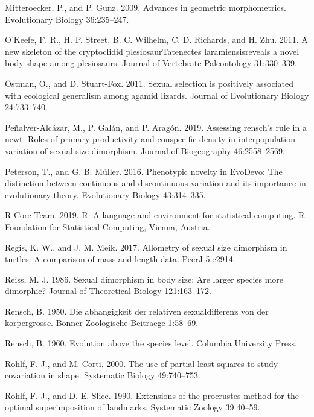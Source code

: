 \documentclass[]{article}
\begin{document}
\hypertarget{ref-MitteroeckerGunz2009}{}
Mitteroecker, P., and P. Gunz. 2009. Advances in geometric
morphometrics. Evolutionary Biology 36:235--247.

\hypertarget{ref-OKeefe2011}{}
O'Keefe, F. R., H. P. Street, B. C. Wilhelm, C. D. Richards, and H. Zhu.
2011. A new skeleton of the cryptoclidid plesiosaurTatenectes
laramiensisreveals a novel body shape among plesiosaurs. Journal of
Vertebrate Paleontology 31:330--339.

\hypertarget{ref-Oestman2011}{}
Östman, O., and D. Stuart-Fox. 2011. Sexual selection is positively
associated with ecological generalism among agamid lizards. Journal of
Evolutionary Biology 24:733--740.

\hypertarget{ref-Penalver-Alcazar2019}{}
Peñalver-Alcázar, M., P. Galán, and P. Aragón. 2019. Assessing rensch's
rule in a newt: Roles of primary productivity and conspecific density in
interpopulation variation of sexual size dimorphism. Journal of
Biogeography 46:2558--2569.

\hypertarget{ref-Peterson2016}{}
Peterson, T., and G. B. Müller. 2016. Phenotypic novelty in EvoDevo: The
distinction between continuous and discontinuous variation and its
importance in evolutionary theory. Evolutionary Biology 43:314--335.

\hypertarget{ref-R-Base}{}
R Core Team. 2019. R: A language and environment for statistical
computing. R Foundation for Statistical Computing, Vienna, Austria.

\hypertarget{ref-Regis2017}{}
Regis, K. W., and J. M. Meik. 2017. Allometry of sexual size dimorphism
in turtles: A comparison of mass and length data. PeerJ 5:e2914.

\hypertarget{ref-Reiss1986}{}
Reiss, M. J. 1986. Sexual dimorphism in body size: Are larger species
more dimorphic? Journal of Theoretical Biology 121:163--172.

\hypertarget{ref-Rensch1950}{}
Rensch, B. 1950. Die abhangigkeit der relativen sexualdifferenz von der
korpergrosse. Bonner Zoologische Beitraege 1:58--69.

\hypertarget{ref-Rensch1960}{}
Rensch, B. 1960. Evolution above the species level. Columbia University
Press.

\hypertarget{ref-RohlfCorti2000}{}
Rohlf, F. J., and M. Corti. 2000. The use of partial least-squares to
study covariation in shape. Systematic Biology 49:740--753.

\hypertarget{ref-RohlfSlice1990}{}
Rohlf, F. J., and D. E. Slice. 1990. Extensions of the procrustes method
for the optimal superimposition of landmarks. Systematic Zoology
39:40--59.
\end{document}
